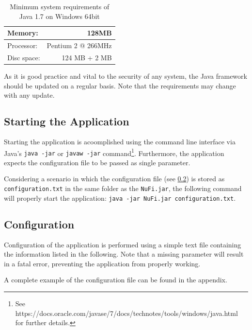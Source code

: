 \documentclass[a4paper, 12pt]{article}
\newcommand{\code}[1]{\colorbox{codegray}{\texttt{#1}}}
\begin{document}
\begin{table}[h]
\centering
\begin{tabular}{ l | r }
Memory: & 128MB \\
\hline
Processor: & Pentium 2 @ 266MHz \\
\hline
Disc space: & 124 MB + 2 MB \\
\end{tabular}
\caption{Minimum system requirements of Java 1.7 on Windows 64bit}
\label{tab:system_requirements_java7}
\end{table}

As it is good practice and vital to the security of any system, the Java
framework should be updated on a regular basis. Note that the requirements may
change with any update.

\subsection{Starting the Application}
Starting the application is acoomplished using the command line interface via
Java's \code{java -jar} or \code{javaw -jar} command\footnote{See
https://docs.oracle.com/javase/7/docs/technotes/tools/windows/java.html for
further details.}. Furthermore, the application expects the configuration file
to be passed as single parameter.

Considering a scenario in which the configuration file (see \ref{sec:configuration}) is
stored as \code{configuration.txt} in the same folder as the \code{NuFi.jar}, the
following command will properly start the application:
\newline\code{java -jar NuFi.jar configuration.txt}.


\subsection{Configuration}\label{sec:configuration}
Configuration of the application is performed using a simple text file
containing the information listed in the following. Note that a missing
parameter will result in a fatal error, preventing the application from properly
working.

A complete example of the configuration file can be found in the appendix.
\end{document}
